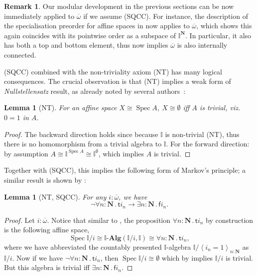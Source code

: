 \documentclass[a4paper,12pt]{amsart}
\newtheorem{lemma}[theorem]{Lemma}
\theoremstyle{definition}
\newtheorem{remark}[theorem]{Remark}
\newcommand{\mb}[1]{\mathbf{#1}}
\newcommand{\mbb}[1]{\mathbb{#1}}
\newcommand{\I}{\mbb I}
\newcommand{\ms}[1]{\mathsf{#1}}
\newcommand{\alg}{\text{-}\mb{Alg}}
\newcommand{\ov}[1]{\overline{#1}}
\newcommand{\pair}[1]{\left\langle#1\right\rangle}
\newcommand{\N}{\mb N}
\newcommand{\fa}[2]{\forall #1\!\colon\!\!#2\mathpunct{.}}
\newcommand{\ex}[2]{\exists #1\!\colon\!\!#2\mathpunct{.}}
\newcommand{\emp}{\emptyset}
\newcommand{\spec}{\operatorname{Spec}}
\begin{document}
\begin{remark}
  Our modular development in the previous sections can be now immediately applied to $\ov\omega$ if we assume (SQCC). For instance, the description of the specialisation preorder for affine spaces in  now applies to $\ov\omega$, which shows this again coincides with its pointwise order as a subspace of $\I^\N$. In particular, it also has both a top and bottom element, thus  now implies $\ov\omega$ is also internally connected. 
\end{remark}

(SQCC) combined with the non-triviality axiom (NT) has many logical consequences. The crucial observation is that (NT) implies a weak form of \emph{Nullstellensatz} result, as already noted by several authors~\cite{blechschmidt2021using,blechschmidt2020general,Cherubini_Coquand_Hutzler_2024}:

\begin{lemma}[NT]\label{lem:nulls}
  For an affine space $X \cong \spec A$, $X \cong \emp$ iff $A$ is trivial, viz.\ $0=1$ in $A$.
\end{lemma}
\begin{proof}
  The backward direction holds since because $\I$ is non-trivial (NT), thus there is no homomorphism from a trivial algebra to $\I$. For the forward direction: by assumption $A \cong \I^{\spec A} \cong \I^\emp$, which implies $A$ is trivial. 
\end{proof}

Together with (SQCC), this implies the following form of Markov's principle; a similar result is shown by \citet{cherubini2024foundation}:

\begin{lemma}[NT, SQCC]\label{lem:markov}
  For any $i : \ov\omega$, we have
  \[ \neg\fa{n}{\N}\ms ti_n \to \ex n\N\ms fi_n. \]
\end{lemma}
\begin{proof}
  Let $i : \ov\omega$. Notice that similar to , the proposition $\fa n\N \ms ti_n$ by construction is the following affine space, 
  \[ \spec\I/i \cong \I\alg(\I/i,\I) \cong \fa n\N \ms ti_n, \]
  where we have abbreviated the countably presented $\I$-algebra $\I/\pair{i_n=1}_{n:\N}$ as $\I/i$. Now if we have $\neg\fa n\N \ms ti_n$, then $\spec\I/i \cong \emp$ which by  implies $\I/i$ is trivial. But this algebra is trivial iff $\ex n\N \ms fi_n$.
\end{proof}
\end{document}
